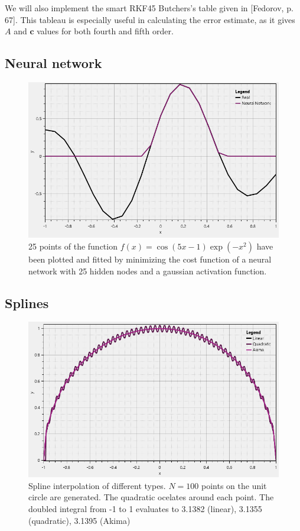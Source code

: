 \documentclass{article}
\begin{document}
We will also implement the smart RKF45 Butchers's table given in [Fedorov, p. 67]. This tableau is especially useful in calculating the error estimate, as it gives $A$ and $\pmb c$ values for both fourth and fifth order.

\subsection{Neural network}
\begin{figure}[H]
	\centering
	\includegraphics[width = .75\textwidth]{nn.png}
	\caption{25 points of the function $f(x) = \cos(5x-1)\exp(-x^2)$ have been plotted and fitted by minimizing the cost function of a neural network with 25 hidden nodes and a gaussian activation function.}
\end{figure}


\subsection{Splines}\label{akima}
\begin{figure}[H]
	\centering
	\includegraphics[width = .75\textwidth]{circleplot.png}
	\caption{Spline interpolation of different types. $N = 100$ points on the unit circle are generated. The quadratic ocelates around each point. The doubled integral from -1 to 1 evaluates to 3.1382 (linear), 3.1355 (quadratic), 3.1395 (Akima)}
\end{figure}
\end{document}
